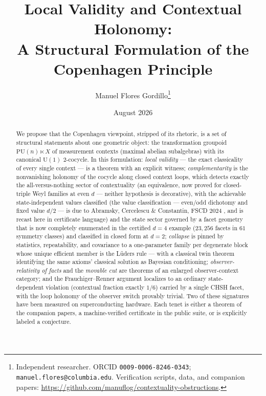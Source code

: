 \documentclass[11pt]{article}
\title{Local Validity and Contextual Holonomy:\\ A Structural Formulation of the Copenhagen Principle}
\author{Manuel Flores Gordillo\thanks{Independent researcher. ORCID
\texttt{0009-0006-8246-0343}; \texttt{manuel.flores@columbia.edu}.
Verification scripts, data, and companion papers:
\url{https://github.com/manuflog/contextuality-obstructions}.}}
\date{August 2026}
\theoremstyle{definition}
\theoremstyle{remark}
\newcommand{\U}{\mathrm{U}}
\newcommand{\PU}{\mathrm{PU}}
\begin{document}
\maketitle

\begin{abstract}
We propose that the Copenhagen viewpoint, stripped of its rhetoric, is a set of
structural statements about one geometric object: the transformation groupoid
$\PU(n)\ltimes X$ of measurement contexts (maximal abelian subalgebras) with its
canonical $\U(1)$ $2$-cocycle. In this formulation: \emph{local validity} --- the exact
classicality of every single context --- is a theorem with an explicit witness;
\emph{complementarity} is the nonvanishing holonomy of the cocycle along closed context
loops, which detects exactly the all-versus-nothing sector of contextuality (an equivalence,
now proved for closed-triple Weyl families at even $d$ --- neither hypothesis is decorative),
with the
achievable state-independent values classified (the value classification --- even/odd dichotomy and
fixed value $d/2$ --- is due to Abramsky, Cercelescu \& Constantin, FSCD 2024 \cite{ACC}, and is recast here in
certificate language) and the state sector governed by a facet
geometry that is now completely enumerated in the certified $d=4$ example ($23{,}256$
facets in $61$ symmetry classes) and classified in closed form at $d=2$;
\emph{collapse} is pinned by statistics, repeatability, and covariance to a
one-parameter family per degenerate block whose unique efficient member is the
L\"uders rule --- with a classical twin theorem identifying the same axioms' classical
solution as Bayesian conditioning; \emph{observer-relativity of facts} and the \emph{movable cut}
are theorems of an enlarged observer-context category; and the Frauchiger--Renner
argument localizes to an ordinary state-dependent violation (contextual fraction exactly
$1/6$) carried by a single CHSH facet, with the loop holonomy of the observer switch
provably trivial. Two of these signatures have been measured on superconducting hardware.
Each tenet is either a theorem of the companion papers, a machine-verified certificate in
the public suite, or is explicitly labeled a conjecture.
\end{abstract}
\end{document}

